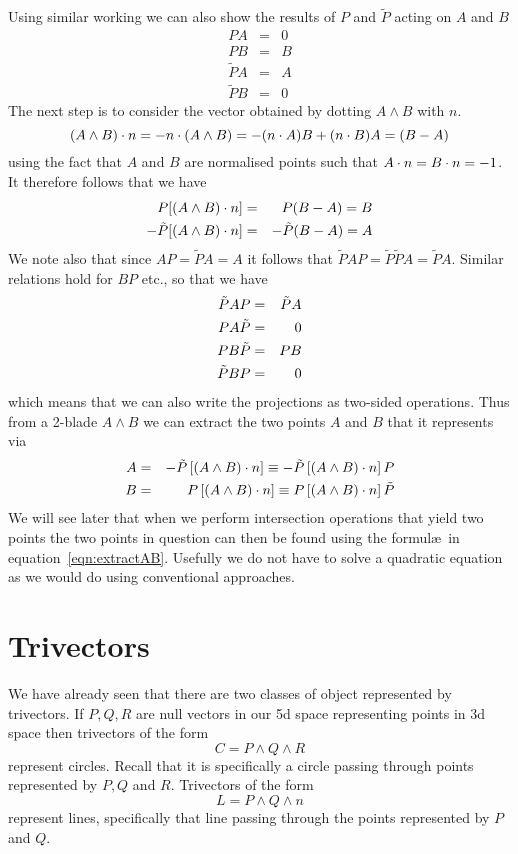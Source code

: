Using similar working we can also show the results of
$P$ and $\tilde{P}$ acting on $A$ and $B$
%
\begin{eqnarray}
 PA & = & 0 \\
 PB & = & B \\
 \tilde{P}A & = & A  \\
 \tilde{P}B & = & 0
\end{eqnarray}
%
The next step is to consider the vector obtained by
dotting $A\wedge B$ with $n$.
%
\begin{equation}
  (A\wedge B)\cdot n = -n\cdot (A\wedge B) = -(n\cdot A)B + (n\cdot
  B)A = (B-A)
\end{equation}
%
using the fact that $A$ and $B$ are normalised points
such that $A\cdot n=B\cdot n = -1$. It therefore follows that
we have
%
\begin{eqnarray}
  P [(A\wedge B)\cdot n] & = & P(B - A) = B \\
 - \tilde{P} [(A\wedge B)\cdot n] & = & -\tilde{P}(B - A) = A
\end{eqnarray}
%
We note also that since $AP = \tilde{P}A = A$ 
it follows that
$\tilde{P}A P = \tilde{P}\tilde{P}A = \tilde{P}A$.
Similar relations hold for $BP$ etc., so that we have
%
\begin{eqnarray}
 \tilde{P}AP & = & \tilde{P}A \nonumber \\
 PA\tilde{P} & = & 0 \nonumber \\
{P}B\tilde{P} & = & {P}B \nonumber \\
\tilde{P}BP & = & 0 \nonumber
\end{eqnarray}
%
which means that we can also write the projections as
two-sided operations.
%
Thus from a 2-blade $A\wedge B$ we can extract the two
points $A$ and $B$ that it represents via
%
\begin{eqnarray}
A & = & -\tilde{P}\left[(A\wedge B)\cdot n\right] \equiv
-\tilde{P}\left[(A\wedge B)\cdot n\right]P  \nonumber
\\
B & = & {P}\left[(A\wedge B)\cdot n\right] \equiv
{P}\left[(A\wedge B)\cdot n\right]\tilde{P} \label{eqn:extractAB}
\end{eqnarray}
%
We will see later that when we perform intersection operations
that yield two points the two points in question can then be found 
using the formul\ae\ in equation~\ref{eqn:extractAB}. Usefully we do not 
have to solve a quadratic equation as we would do using
conventional approaches.

\section{Trivectors}
We have already seen that there are two classes of object
represented by trivectors. If $P,Q,R$ are null vectors in our 5d
space representing points in 3d space then trivectors of the form
%
\[ C = P\wedge Q\wedge R \]
%
represent circles. Recall that it is specifically a circle 
passing through points represented by $P,Q$ and $R$. Trivectors of the form
%
\[ L = P\wedge Q\wedge n \]
%
represent lines, specifically that line passing through the
points represented by $P$ and $Q$.


